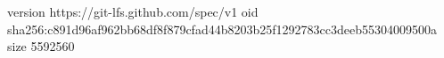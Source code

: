 version https://git-lfs.github.com/spec/v1
oid sha256:c891d96af962bb68df8f879cfad44b8203b25f1292783cc3deeb55304009500a
size 5592560
